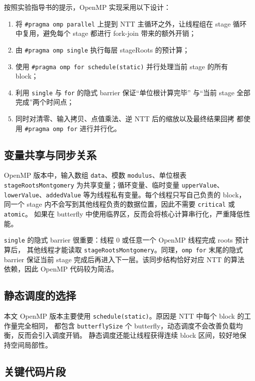 \documentclass[UTF8,a4paper,10pt]{ctexart}
\begin{document}
按照实验指导书的提示，OpenMP 实现采用以下设计：

\begin{enumerate}
  \item 将 \texttt{\#pragma omp parallel} 上提到 NTT 主循环之外，让线程组在
        stage 循环中复用，避免每个 stage 都进行 fork-join 带来的额外开销；
  \item 由 \texttt{\#pragma omp single} 执行每层 stageRoots 的预计算；
  \item 使用 \texttt{\#pragma omp for schedule(static)} 并行处理当前 stage
        的所有 block；
  \item 利用 \texttt{single} 与 \texttt{for} 的隐式 barrier 保证``单位根计算完毕''
        与``当前 stage 全部完成''两个时间点；
  \item 同时对清零、输入拷贝、点值乘法、逆 NTT 后的缩放以及最终结果回拷
        都使用 \texttt{\#pragma omp for} 进行并行化。
\end{enumerate}


\subsection{变量共享与同步关系}

OpenMP 版本中，输入数组 \texttt{data}、模数 \texttt{modulus}、单位根表
\texttt{stageRootsMontgomery} 为共享变量；循环变量、临时变量 \texttt{upperValue}、
\texttt{lowerValue}、\texttt{addedValue} 等为线程私有变量。每个线程只写自己负责的 block，
同一个 stage 内不会写到其他线程负责的数据位置，因此不需要 \texttt{critical} 或 \texttt{atomic}。
如果在 butterfly 中使用临界区，反而会将核心计算串行化，严重降低性能。

\texttt{single} 的隐式 barrier 很重要：线程 0 或任意一个 OpenMP 线程完成 roots 预计算后，
其他线程才能读取 \texttt{stageRootsMontgomery}。同理，\texttt{omp for} 末尾的隐式 barrier
保证当前 stage 完成后再进入下一层。该同步结构恰好对应 NTT 的算法依赖，因此 OpenMP 代码较为简洁。

\subsection{静态调度的选择}

本文 OpenMP 版本主要使用 \texttt{schedule(static)}。原因是 NTT 中每个 block 的工作量完全相同，
都包含 \texttt{butterflySize} 个 butterfly，动态调度不会改善负载均衡，反而会引入调度开销。
静态调度还能让线程获得连续 block 区间，较好地保持空间局部性。

\subsection{关键代码片段}
\end{document}
